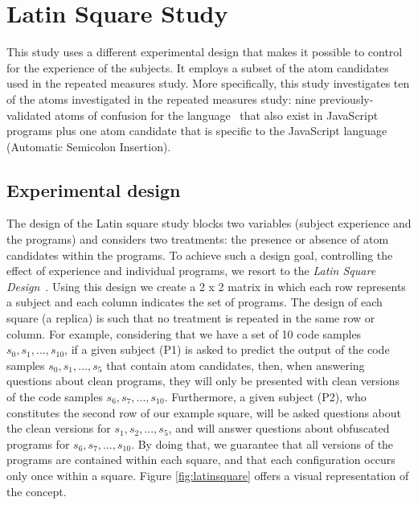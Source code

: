 \section{Latin Square Study}\label{sec:s02}

This study uses a different experimental design that makes it possible to control for the experience of the subjects. It employs a subset of the atom candidates used in the repeated measures study. More specifically, this study investigates ten of the atoms investigated in the repeated measures study: 
nine previously-validated atoms of confusion for the \clang language~\cite{DBLP:conf/sigsoft/GopsteinIYDZYC17} that also exist in JavaScript programs plus one atom candidate that is specific to the JavaScript language (Automatic Semicolon Insertion).  

\subsection{Experimental design} 

The design of the Latin square study blocks two variables (subject experience and the programs) and considers two treatments: the presence or absence of atom candidates within the programs. To achieve such a design goal, controlling the effect of experience and individual programs, we resort to the \textit{Latin Square Design}~\cite{Hunter-Experimenters}. Using this design we create a 2 x 2 matrix in which each row represents a subject and each column indicates the set of programs. The design of each square (a replica) is such that no treatment is repeated in the same row or column. For example, considering that we have a set of 10
code samples $s_0, s_1, ..., s_{10}$, if a given subject (P1) is asked to predict the output of the code samples $s_0, s_1, ..., s_5$ that contain atom candidates, then, when answering questions about clean programs, they will only be presented with clean versions of the code samples $s_6, s_7,..., s_{10}$. Furthermore, a given subject (P2), who constitutes the second row of our example square, will be asked questions about the clean versions for $s_1, s_2, ..., s_5$, and will answer questions about obfuscated programs for $s_6, s_7,..., s_{10}$. By doing that, we guarantee that all versions of the programs are contained within each square, and that each configuration occurs only once within a square. Figure \ref{fig:latinsquare} offers a visual representation of the concept.

